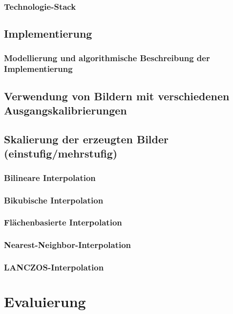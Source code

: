 \documentclass[
fontsize=10pt, 
listof = totoc,
parskip = half	
]{report}
\begin{document}
\subsection{Technologie-Stack}

\section{Implementierung}

\subsection{Modellierung und algorithmische Beschreibung der Implementierung}

\section{Verwendung von Bildern mit verschiedenen Ausgangskalibrierungen}

\section{Skalierung der erzeugten Bilder (einstufig/mehrstufig)}

\subsection{Bilineare Interpolation}

\subsection{Bikubische Interpolation}

\subsection{Flächenbasierte Interpolation}

\subsection{Nearest-Neighbor-Interpolation}

\subsection{LANCZOS-Interpolation}



\chapter{Evaluierung}
\end{document}
